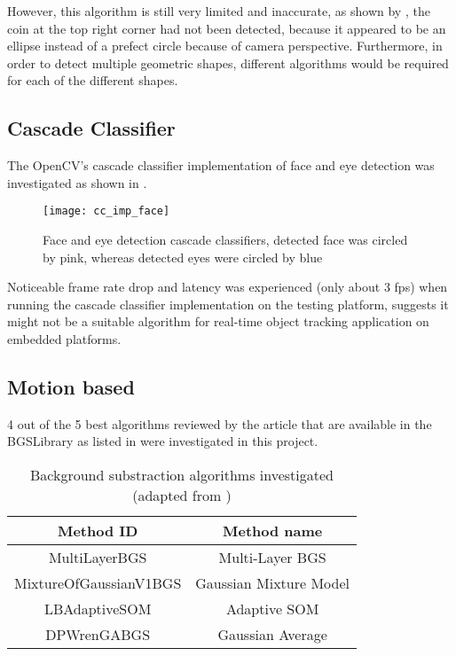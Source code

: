 However, this algorithm is still very limited and inaccurate, as shown by , the coin at the top right corner had not been detected, because it appeared to be an ellipse instead of a prefect circle because of camera perspective. Furthermore, in order to detect multiple geometric shapes, different algorithms would be required for each of the different shapes.

\subsection{Cascade Classifier}


The OpenCV's cascade classifier implementation \cite{opencv:cc} of face and eye detection was investigated as shown in .

\begin{figure}[H]
  \centering
  \texttt{[image: cc\_imp\_face]}
  \caption{Face and eye detection cascade classifiers, detected face was circled by pink, whereas detected eyes were circled by blue}
  \label{Figure:cc_face}
\end{figure}

Noticeable frame rate drop and latency was experienced (only about 3 fps) when running the cascade classifier implementation on the testing platform, suggests it might not be a suitable algorithm for real-time object tracking application on embedded platforms.

\subsection{Motion based}

4 out of the 5 best algorithms reviewed by the article \cite{bgs:article} that are available in the BGSLibrary as listed in  were investigated in this project.


\begin{table}[H]
  \centering
  \begin{tabular}{cc}
  \toprule
  \textbf{Method ID} & \textbf{Method name}\\
  \midrule
  MultiLayerBGS & Multi-Layer BGS \\
  MixtureOfGaussianV1BGS & Gaussian Mixture Model \\
  LBAdaptiveSOM & Adaptive SOM \\
  DPWrenGABGS & Gaussian Average \\
  \bottomrule
  \end{tabular}
  \caption{Background substraction algorithms investigated (adapted from \cite{bgslibrary})}
  \label{Table:bgs}
\end{table}

